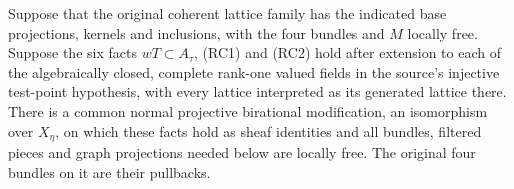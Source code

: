 \begin{lemma}
\label{lem:relative-chern-lattice-diagram}
Suppose that the original coherent lattice family has the indicated
base projections, kernels and inclusions, with the four bundles and
\(M\) locally free. Suppose the six facts
\(wT\subset A_\tau\), (RC1) and (RC2) hold after extension to
each of the algebraically closed, complete rank-one valued fields
in the source's injective test-point hypothesis, with every
lattice interpreted as its generated lattice there.
There is a common normal projective birational modification,
an isomorphism over \(X_\eta\), on which these facts hold
as sheaf identities and all bundles, filtered pieces and graph
projections needed below are locally free. The original four
bundles on it are their pullbacks.
\end{lemma}
